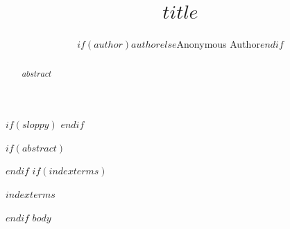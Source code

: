 \documentclass[$if(classoption)$$classoption$$else$journal$endif$]{IEEEtran}
\begin{document}
$if(sloppy)$
\sloppy
$endif$
\title{$title$}
\author{$if(author)$$author$$else$Anonymous Author$endif$}
\maketitle
$if(abstract)$
\begin{abstract}
$abstract$
\end{abstract}
$endif$
$if(indexterms)$
\begin{IEEEkeywords}
$indexterms$
\end{IEEEkeywords}
$endif$
$body$
\end{document}
